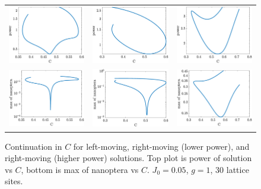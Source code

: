 \documentclass{article}
\begin{document}
\begin{figure}[H]
    \centering
    \begin{tabular}{ccc}
    \includegraphics[width=5cm]{leftcontpower}   &
    \includegraphics[width=5cm]{rightcontpower}  &
    \includegraphics[width=5cm]{right0contpower} \\
    \includegraphics[width=5cm]{leftcontnanop}   &
    \includegraphics[width=5cm]{rightcontnanop}  &
    \includegraphics[width=5cm]{right0contnanop} 
    \end{tabular}
    \caption{Continuation in $C$ for left-moving, right-moving (lower power), and right-moving (higher power) solutions. Top plot is power of solution vs $C$, bottom is max of nanoptera vs $C$. $J_0 = 0.05$, $g=1$, 30 lattice sites.}
    \label{fig:cont}
\end{figure}
\end{document}
